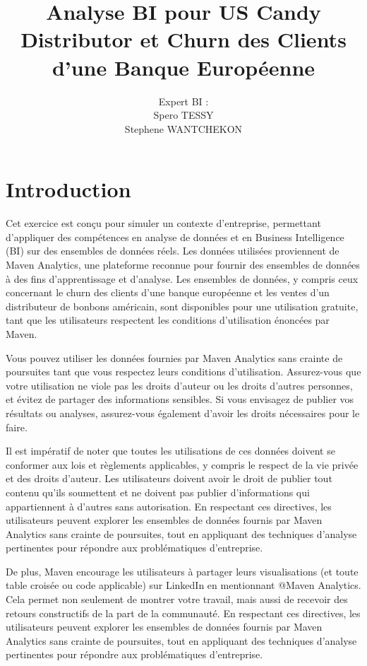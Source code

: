 \documentclass{article}
\title{Analyse BI pour \textbf{US Candy Distributor} et \textbf{Churn des Clients d'une Banque Européenne} }
\author{Expert BI : \\ Spero TESSY \\ Stephene WANTCHEKON}
\begin{document}
\maketitle









\section{Introduction}

Cet exercice est conçu pour simuler un contexte d'entreprise, permettant d'appliquer des compétences en analyse de données et en Business Intelligence (BI) sur des ensembles de données réels. Les données utilisées proviennent de Maven Analytics, une plateforme reconnue pour fournir des ensembles de données à des fins d'apprentissage et d'analyse. Les ensembles de données, y compris ceux concernant le churn des clients d'une banque européenne et les ventes d'un distributeur de bonbons américain, sont disponibles pour une utilisation gratuite, tant que les utilisateurs respectent les conditions d'utilisation énoncées par Maven.

Vous pouvez utiliser les données fournies par Maven Analytics sans crainte de poursuites tant que vous respectez leurs conditions d'utilisation. Assurez-vous que votre utilisation ne viole pas les droits d'auteur ou les droits d'autres personnes, et évitez de partager des informations sensibles. Si vous envisagez de publier vos résultats ou analyses, assurez-vous également d'avoir les droits nécessaires pour le faire.

Il est impératif de noter que toutes les utilisations de ces données doivent se conformer aux lois et règlements applicables, y compris le respect de la vie privée et des droits d'auteur. Les utilisateurs doivent avoir le droit de publier tout contenu qu'ils soumettent et ne doivent pas publier d'informations qui appartiennent à d'autres sans autorisation. En respectant ces directives, les utilisateurs peuvent explorer les ensembles de données fournis par Maven Analytics sans crainte de poursuites, tout en appliquant des techniques d'analyse pertinentes pour répondre aux problématiques d'entreprise.



De plus, Maven encourage les utilisateurs à partager leurs visualisations (et toute table croisée ou code applicable) sur LinkedIn en mentionnant @Maven Analytics. Cela permet non seulement de montrer votre travail, mais aussi de recevoir des retours constructifs de la part de la communauté. En respectant ces directives, les utilisateurs peuvent explorer les ensembles de données fournis par Maven Analytics sans crainte de poursuites, tout en appliquant des techniques d'analyse pertinentes pour répondre aux problématiques d'entreprise.
\end{document}
